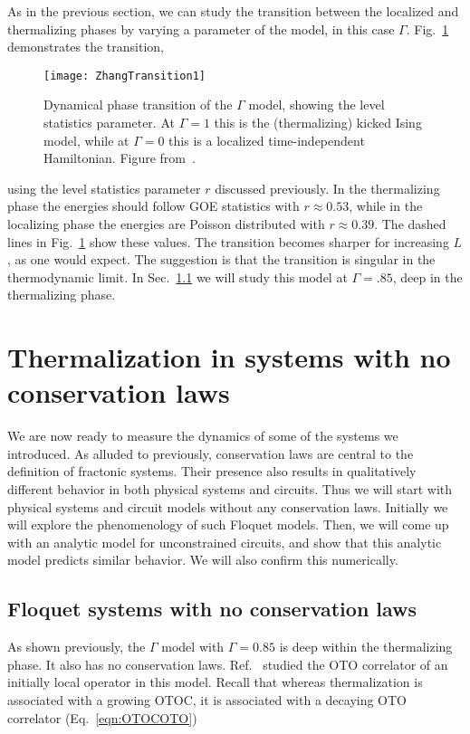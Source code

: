 \documentclass[a4paper,11pt]{article}
\begin{document}
As in the previous section, we can study the transition between the localized and thermalizing phases by varying a parameter of the model, in this case $\Gamma$. Fig.~\ref{fig:floqtrans} demonstrates the transition, 
\begin{figure}
	\centering
	\texttt{[image: ZhangTransition1]}
	\caption{Dynamical phase transition of the $\Gamma$ model, showing the level statistics parameter. At $\Gamma=1$ this is the (thermalizing) kicked Ising model, while at $\Gamma=0$ this is a localized time-independent Hamiltonian. Figure from~\cite{ZhangFloq}.}
	\label{fig:floqtrans}
\end{figure}
using the level statistics parameter $r$ discussed previously. In the thermalizing phase the energies should follow GOE statistics with $r \approx 0.53$, while in the localizing phase the energies are Poisson distributed with $r\approx 0.39$. The dashed lines in Fig.~\ref{fig:floqtrans} show these values. The transition becomes sharper for increasing $L$, as one would expect. The suggestion is that the transition is singular in the thermodynamic limit. In Sec.~\ref{sub:fncons} we will study this model at $\Gamma=.85$, deep in the thermalizing phase.


\section{Thermalization in systems with no conservation laws} \label{sec:ncons}

We are now ready to measure the dynamics of some of the systems we introduced. As alluded to previously, conservation laws are central to the definition of fractonic systems. Their presence also results in qualitatively different behavior in both physical systems and circuits. Thus we will start with physical systems and circuit models without any conservation laws. Initially we will explore the phenomenology of such Floquet models. Then, we will come up with an analytic model for unconstrained circuits, and show that this analytic model predicts similar behavior. We will also confirm this numerically.

\subsection{Floquet systems with no conservation laws} \label{sub:fncons}

As shown previously, the $\Gamma$ model with $\Gamma=0.85$ is deep within the thermalizing phase. It also has no conservation laws. Ref.~\cite{ChenOtoc} studied the OTO correlator of an initially local operator in this model. Recall that whereas thermalization is associated with a growing OTOC, it is associated with a decaying OTO correlator (Eq.~\ref{eqn:OTOCOTO})
\end{document}
